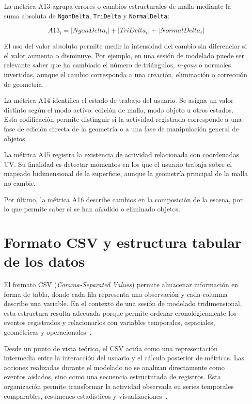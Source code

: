 La métrica A13 agrupa errores o cambios estructurales de malla mediante la suma absoluta de \texttt{NgonDelta}, \texttt{TriDelta} y \texttt{NormalDelta}:

\[
A13_i = |NgonDelta_i| + |TriDelta_i| + |NormalDelta_i|
\]

El uso del valor absoluto permite medir la intensidad del cambio sin diferenciar si el valor aumenta o disminuye. Por ejemplo, en una sesión de modelado puede ser relevante saber que ha cambiado el número de triángulos, \textit{n-gons} o normales invertidas, aunque el cambio corresponda a una creación, eliminación o corrección de geometría.

La métrica A14 identifica el estado de trabajo del usuario. Se asigna un valor distinto según el modo activo: edición de malla, modo objeto u otros estados. Esta codificación permite distinguir si la actividad registrada corresponde a una fase de edición directa de la geometría o a una fase de manipulación general de objetos.

La métrica A15 registra la existencia de actividad relacionada con coordenadas UV. Su finalidad es detectar momentos en los que el usuario trabaja sobre el mapeado bidimensional de la superficie, aunque la geometría principal de la malla no cambie.

Por último, la métrica A16 describe cambios en la composición de la escena, por lo que permite saber si se han añadido o eliminado objetos. 

\section{Formato CSV y estructura tabular de los datos}

El formato CSV (\textit{Comma-Separated Values}) permite almacenar información en forma de tabla, donde cada fila representa una observación y cada columna describe una variable. En el contexto de una sesión de modelado tridimensional, esta estructura resulta adecuada porque permite ordenar cronológicamente los eventos registrados y relacionarlos con variables temporales, espaciales, geométricas y operacionales~\cite{mckinney2022python}.

Desde un punto de vista teórico, el CSV actúa como una representación intermedia entre la interacción del usuario y el cálculo posterior de métricas. Las acciones realizadas durante el modelado no se analizan directamente como eventos aislados, sino como una secuencia estructurada de registros. Esta organización permite transformar la actividad observada en series temporales comparables, resúmenes estadísticos y visualizaciones~\cite{vanderalst2016process}.

